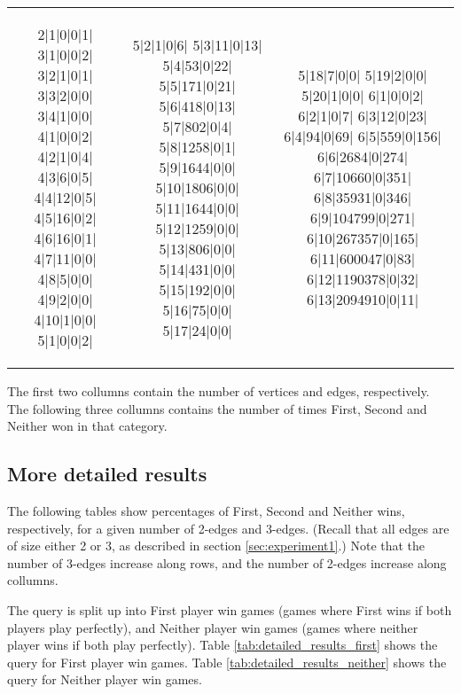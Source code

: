 \begin{tabular}{c | c | c}
\begin{minipage}{1.0in}
\begin{output}
2|1|0|0|1|
3|1|0|0|2|
3|2|1|0|1|
3|3|2|0|0|
3|4|1|0|0|
4|1|0|0|2|
4|2|1|0|4|
4|3|6|0|5|
4|4|12|0|5|
4|5|16|0|2|
4|6|16|0|1|
4|7|11|0|0|
4|8|5|0|0|
4|9|2|0|0|
4|10|1|0|0|
5|1|0|0|2|
\end{output}
\end{minipage}
&
\begin{minipage}{1.0in}
\begin{output}
5|2|1|0|6|
5|3|11|0|13|
5|4|53|0|22|
5|5|171|0|21|
5|6|418|0|13|
5|7|802|0|4|
5|8|1258|0|1|
5|9|1644|0|0|
5|10|1806|0|0|
5|11|1644|0|0|
5|12|1259|0|0|
5|13|806|0|0|
5|14|431|0|0|
5|15|192|0|0|
5|16|75|0|0|
5|17|24|0|0|
\end{output}
\end{minipage}
&
\begin{minipage}{1.0in}
\begin{output}
5|18|7|0|0|
5|19|2|0|0|
5|20|1|0|0|
6|1|0|0|2|
6|2|1|0|7|
6|3|12|0|23|
6|4|94|0|69|
6|5|559|0|156|
6|6|2684|0|274|
6|7|10660|0|351|
6|8|35931|0|346|
6|9|104799|0|271|
6|10|267357|0|165|
6|11|600047|0|83|
6|12|1190378|0|32|
6|13|2094910|0|11|
\end{output}
\end{minipage}
\\
\end{tabular}

The first two collumns contain the number of vertices and edges, respectively. The following three collumns contains the number of times First, Second and Neither won in that category.

\subsection{More detailed results}

The following tables show percentages of First, Second and Neither wins, respectively, for a given number of 2-edges and 3-edges.
(Recall that all edges are of size either 2 or 3, as described in section \ref{sec:experiment1}.)
Note that the number of 3-edges increase along rows, and the number of 2-edges increase along collumns.

The query is split up into First player win games (games where First wins if both players play perfectly), and Neither player win games (games where neither player wins if both play perfectly).
Table \ref{tab:detailed_results_first} shows the query for First player win games. Table \ref{tab:detailed_results_neither} shows the query for Neither player win games.

